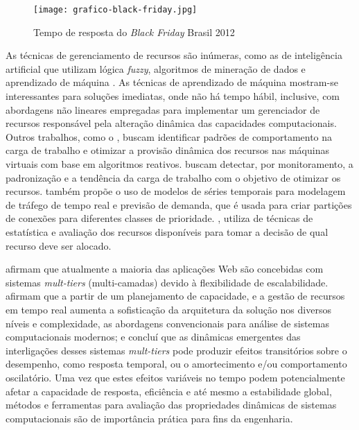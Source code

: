 \begin{figure}[htb]
	\centering
	\texttt{[image: grafico-black-friday.jpg]}
	\caption{Tempo de resposta do \textit{Black Friday} Brasil 2012}
	\label{fig:grafico-black-friday}
\end{figure}

As técnicas de gerenciamento de recursos são inúmeras, como as de inteligência artificial que utilizam lógica \textit{fuzzy}, algoritmos de mineração de dados e aprendizado de máquina \cite{Nobile2007}. As técnicas de aprendizado de máquina mostram-se interessantes para soluções imediatas, onde não há tempo hábil, inclusive, com abordagens não lineares empregadas para implementar um gerenciador de recursos responsável pela alteração dinâmica das capacidades computacionais. Outros trabalhos, como o , buscam identificar padrões de comportamento na carga de trabalho e otimizar a provisão dinâmica dos recursos nas máquinas virtuais com base em algoritmos reativos.  buscam detectar, por monitoramento, a padronização e a tendência da carga de trabalho com o objetivo de otimizar os recursos.  também propõe o uso de modelos de séries temporais para modelagem de tráfego de tempo real e previsão de demanda, que é usada para criar partições de conexões para diferentes classes de prioridade. , utiliza de técnicas de estatística e avaliação dos recursos disponíveis para tomar a decisão de qual recurso deve ser alocado.

 afirmam que atualmente a maioria das aplicações Web são concebidas com sistemas \textit{mult-tiers} (multi-camadas) devido à flexibilidade de escalabilidade.%
 afirmam que a partir de um planejamento de capacidade, e a gestão de recursos em tempo real aumenta a sofisticação da arquitetura da solução nos diversos níveis e complexidade, as abordagens convencionais para análise de sistemas computacionais modernos; e concluí que as dinâmicas emergentes das interligações desses sistemas \textit{mult-tiers} pode produzir efeitos transitórios sobre o desempenho, como resposta temporal, ou o amortecimento e/ou comportamento oscilatório. Uma vez que estes efeitos variáveis no tempo podem potencialmente afetar a capacidade de resposta, eficiência e até mesmo a estabilidade global, métodos e ferramentas para avaliação das propriedades dinâmicas de sistemas computacionais são de importância prática para fins da engenharia.

